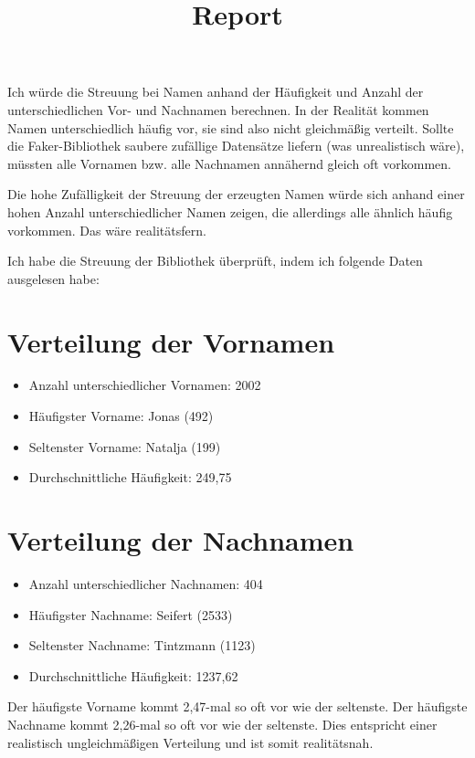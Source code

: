 \documentclass[a4paper,12pt]{article}
\title{Report}
\author{}
\date{}
\begin{document}
\maketitle

Ich würde die Streuung bei Namen anhand der Häufigkeit und Anzahl der unterschiedlichen Vor- und Nachnamen berechnen.
In der Realität kommen Namen unterschiedlich häufig vor, sie sind also nicht gleichmäßig verteilt.
Sollte die Faker-Bibliothek saubere zufällige Datensätze liefern (was unrealistisch wäre), müssten alle Vornamen bzw.
alle Nachnamen annähernd gleich oft vorkommen.

Die hohe Zufälligkeit der Streuung der erzeugten Namen würde sich anhand einer hohen Anzahl unterschiedlicher Namen zeigen,
die allerdings alle ähnlich häufig vorkommen. Das wäre realitätsfern.

Ich habe die Streuung der Bibliothek überprüft, indem ich folgende Daten ausgelesen habe:

\section*{Verteilung der Vornamen}
\begin{itemize}
    \item Anzahl unterschiedlicher Vornamen: 2002
    \item Häufigster Vorname: Jonas (492)
    \item Seltenster Vorname: Natalja (199)
    \item Durchschnittliche Häufigkeit: 249{,}75
\end{itemize}

\section*{Verteilung der Nachnamen}
\begin{itemize}
    \item Anzahl unterschiedlicher Nachnamen: 404
    \item Häufigster Nachname: Seifert (2533)
    \item Seltenster Nachname: Tintzmann (1123)
    \item Durchschnittliche Häufigkeit: 1237{,}62
\end{itemize}

Der häufigste Vorname kommt 2{,}47-mal so oft vor wie der seltenste.
Der häufigste Nachname kommt 2{,}26-mal so oft vor wie der seltenste.
Dies entspricht einer realistisch ungleichmäßigen Verteilung und ist somit realitätsnah.
\end{document}
